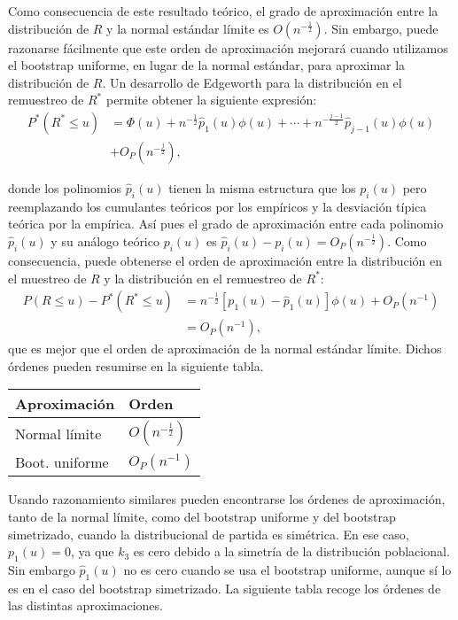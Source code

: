 \documentclass[
]{book}
\theoremstyle{break}
\theoremstyle{definition}
\theoremstyle{definition}
\theoremstyle{definition}
\theoremstyle{definition}
\theoremstyle{remark}
\begin{document}
Como consecuencia de este resultado teórico, el grado de aproximación
entre la distribución de \(R\) y la normal estándar límite es
\(O (n^{-\frac{1}{2}})\). Sin embargo, puede razonarse
fácilmente que este orden de aproximación mejorará cuando utilizamos el
bootstrap uniforme, en lugar de la normal estándar, para aproximar la
distribución de \(R\). Un desarrollo de Edgeworth para la distribución en
el remuestreo de \(R^{\ast}\) permite obtener la siguiente expresión:
\[\begin{aligned}
P^{\ast}\left( R^{\ast}\leq u \right) &= \Phi \left( u \right) +n^{-\frac{1}{2}
}\hat{p}_1\left( u \right) \phi \left( u \right) +\cdots +n^{-\frac{j-1}{2}}
\hat{p}_{j-1}\left( u \right) \phi \left( u \right) \\
&+ O_{P}\left( n^{-\frac{j}{2}} \right),
\end{aligned}\]

donde los polinomios \(\hat{p}_i\left( u \right)\) tienen la misma
estructura que los \(p_i\left( u \right)\) pero reemplazando los
cumulantes teóricos por los empíricos y la desviación típica teórica por
la empírica. Así pues el grado de aproximación entre cada polinomio
\(\hat{p}_i( u )\) y su análogo teórico \(p_i( u )\) es
\(\hat{p}_i( u ) -p_i( u ) = O_{P}( n^{-\frac{1}{2}} )\).
Como consecuencia, puede obtenerse el orden de aproximación entre la distribución
en el muestreo de \(R\) y la distribución en el remuestreo de \(R^{\ast}\):
\[\begin{aligned}
P\left( R\leq u \right) -P^{\ast}\left( R^{\ast}\leq u \right) &=  n^{-\frac{1}{
2}}\left[ p_1\left( u \right) -\hat{p}_1\left( u \right) \right] \phi
\left( u \right) +O_{P}\left( n^{-1} \right) \\
&=  O_{P}\left( n^{-1} \right),\end{aligned}\]que es mejor que el orden
de aproximación de la normal estándar límite. Dichos órdenes pueden
resumirse en la siguiente tabla.

\begin{longtable}[]{@{}ll@{}}
\toprule
Aproximación & Orden \\
\midrule
\endhead
Normal límite & \(O\left( n^{-\frac{1}{2}} \right)\) \\
Boot. uniforme & \(O_{P}\left( n^{-1} \right)\) \\
\bottomrule
\end{longtable}

Usando razonamiento similares pueden encontrarse los órdenes de
aproximación, tanto de la normal límite, como del bootstrap uniforme y
del bootstrap simetrizado, cuando la distribucional de partida es
simétrica. En ese caso, \(p_1\left( u \right) =0\), ya que \(k_3\) es
cero debido a la simetría de la distribución poblacional. Sin embargo
\(\hat{p}_1\left( u \right)\) no es cero cuando se usa el bootstrap
uniforme, aunque sí lo es en el caso del bootstrap simetrizado. La
siguiente tabla recoge los órdenes de las distintas aproximaciones.
\end{document}
